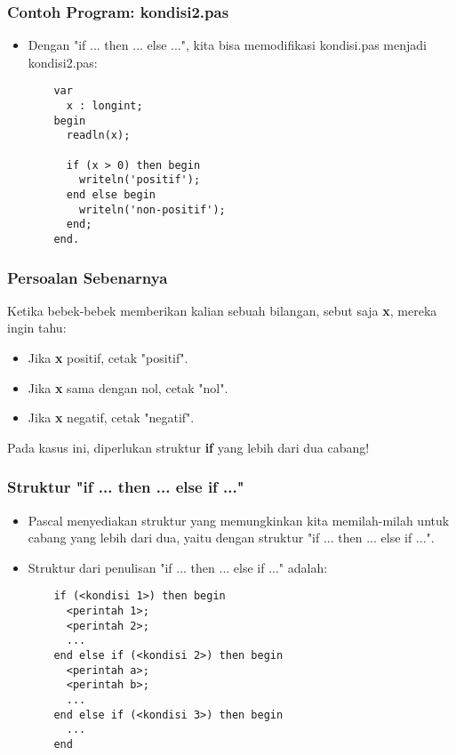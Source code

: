\begin{frame}[fragile]
\frametitle{Contoh Program: kondisi2.pas}
\begin{itemize}
  \item Dengan "if ... then ... else ...", kita bisa memodifikasi kondisi.pas menjadi kondisi2.pas:
  \begin{lstlisting}
    var
      x : longint;
    begin
      readln(x);

      if (x > 0) then begin
        writeln('positif');
      end else begin
        writeln('non-positif');
      end;
    end.
  \end{lstlisting}
\end{itemize}
\end{frame}

\begin{frame}
\frametitle{Persoalan Sebenarnya}
Ketika bebek-bebek memberikan kalian sebuah bilangan, sebut saja \textbf{x}, mereka ingin tahu:
\begin{itemize}
  \item Jika \textbf{x} positif, cetak "positif".
  \item Jika \textbf{x} sama dengan nol, cetak "nol".
  \item Jika \textbf{x} negatif, cetak "negatif".
\end{itemize}

Pada kasus ini, diperlukan struktur \textbf{if} yang lebih dari dua cabang!
\end{frame}

\begin{frame}[fragile]
\frametitle{Struktur "if ... then ... else if ..."}
\begin{itemize}
  \item Pascal menyediakan struktur yang memungkinkan kita memilah-milah untuk cabang yang lebih dari dua, yaitu dengan struktur "if ... then ... else if ...".
  \item Struktur dari penulisan "if ... then ... else if ..." adalah:
  \begin{lstlisting}
    if (<kondisi 1>) then begin
      <perintah 1>;
      <perintah 2>;
      ...
    end else if (<kondisi 2>) then begin
      <perintah a>;
      <perintah b>;
      ...
    end else if (<kondisi 3>) then begin
      ...
    end
  \end{lstlisting}

\end{itemize}
\end{frame}

